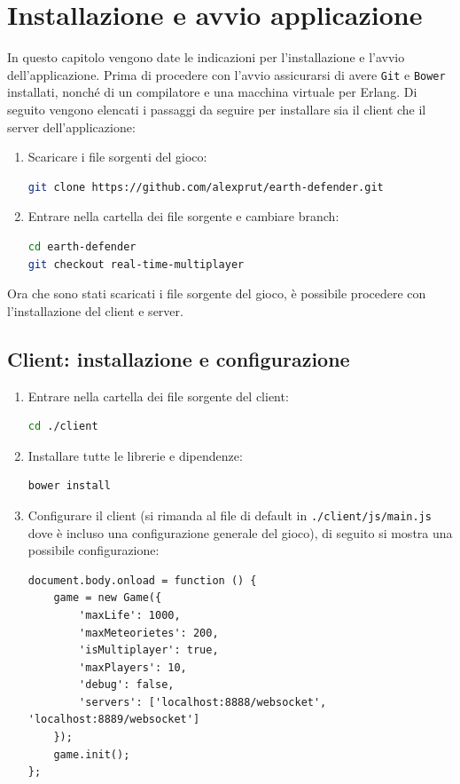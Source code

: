 \documentclass[paper=a4, fontsize=11pt]{scrartcl} %
\numberwithin{equation}{section} %
\numberwithin{figure}{section} %
\numberwithin{table}{section} %
\begin{document}
\section{Installazione e avvio applicazione}
In questo capitolo vengono date le indicazioni per l'installazione e l'avvio dell'applicazione.
Prima di procedere con l'avvio assicurarsi di avere \texttt{Git}\cite{git} e \texttt{Bower}\cite{bower} installati, nonché di un compilatore e una macchina virtuale per Erlang.
Di seguito vengono elencati i passaggi da seguire per installare sia il client che il server dell'applicazione:
\begin{enumerate}  
\item
Scaricare i file sorgenti del gioco:
\begin{lstlisting}[language=bash]
git clone https://github.com/alexprut/earth-defender.git
\end{lstlisting}

\item
Entrare nella cartella dei file sorgente e cambiare branch:
\begin{lstlisting}[language=bash]
cd earth-defender
git checkout real-time-multiplayer
\end{lstlisting}
\end{enumerate}

Ora che sono stati scaricati i file sorgente del gioco, è possibile procedere con l'installazione del client e server.

\subsection{Client: installazione e configurazione}
\begin{enumerate}  
\item
Entrare nella cartella dei file sorgente del client:
\begin{lstlisting}[language=bash]
cd ./client
\end{lstlisting}

\item
Installare tutte le librerie e dipendenze:
\begin{lstlisting}[language=bash]
bower install
\end{lstlisting}

\item
Configurare il client (si rimanda al file di default in \texttt{./client/js/main.js} dove è incluso una configurazione generale del gioco), di seguito si mostra una possibile configurazione:
\begin{lstlisting}
document.body.onload = function () {
    game = new Game({
        'maxLife': 1000,
        'maxMeteorietes': 200,
        'isMultiplayer': true,
        'maxPlayers': 10,
        'debug': false,
        'servers': ['localhost:8888/websocket', 'localhost:8889/websocket']
    });
    game.init();
};
\end{lstlisting}
\end{enumerate}
\end{document}
